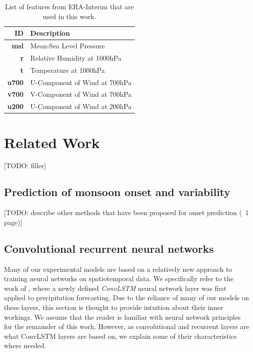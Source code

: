 \begin{table}[h]
  \centering
  \begin{tabular}{rl}
    \toprule
    \textbf{ID} & \textbf{Description} \\
    \midrule
    \textbf{msl} & Mean-Sea Level Pressure \\
    \textbf{r} & Relative Humidity at 1000hPa \\
    \textbf{t} & Temperature at 1000hPa \\
    \textbf{u700} & U-Component of Wind at 700hPa \\
    \textbf{v700} & V-Component of Wind at 700hPa \\
    \textbf{u200} & U-Component of Wind at 200hPa \\
    \bottomrule
  \end{tabular}
  \caption{List of features from ERA-Interim that are used in this work.}
  \label{tab:era_features}
\end{table}

\section{Related Work}
[TODO: filler]

\subsection{Prediction of monsoon onset and variability}
\label{sst:related_prediction}
[TODO:  describe other methods that have been proposed for onset prediction (~1 page)]

\subsection{Convolutional recurrent neural networks}
\label{sst:neural_networks}
Many of our experimental models are based on a relatively new approach to training neural networks on spatiotemporal data. We specifically refer to the work of \citet{Shi.2015}, where a newly defined \textit{ConvLSTM} neural network layer was first applied to precipitation forecasting. Due to the reliance of many of our models on these layers, this section is thought to provide intuition about their inner workings. We assume that the reader is familiar with neural network principles for the remainder of this work. However, as convolutional and recurrent layers are what ConvLSTM layers are based on, we explain some of their characteristics where needed.

